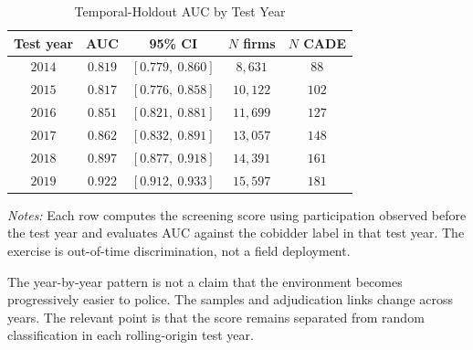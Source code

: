 \begin{table}[htbp]
\centering
\caption{Temporal-Holdout AUC by Test Year}
\label{tab:temporal_holdout_year_submission}
\footnotesize
\begin{threeparttable}
\begin{tabular}{ccccc}
\toprule
Test year & AUC & 95\% CI & $N$ firms & $N$ CADE \\
\midrule
$2014$ & $0.819$ & $[0.779,\ 0.860]$ & $8{,}631$ & $88$ \\
$2015$ & $0.817$ & $[0.776,\ 0.858]$ & $10{,}122$ & $102$ \\
$2016$ & $0.851$ & $[0.821,\ 0.881]$ & $11{,}699$ & $127$ \\
$2017$ & $0.862$ & $[0.832,\ 0.891]$ & $13{,}057$ & $148$ \\
$2018$ & $0.897$ & $[0.877,\ 0.918]$ & $14{,}391$ & $161$ \\
$2019$ & $0.922$ & $[0.912,\ 0.933]$ & $15{,}597$ & $181$ \\
\bottomrule
\end{tabular}
\begin{tablenotes}
\footnotesize
\item \textit{Notes:} Each row computes the screening score using
participation observed before the test year and evaluates AUC
against the cobidder label in that test year. The exercise is
out-of-time discrimination, not a field deployment.
\end{tablenotes}
\end{threeparttable}
\end{table}

The year-by-year pattern is not a claim that the environment
becomes progressively easier to police. The samples and
adjudication links change across years. The relevant point is
that the score remains separated from random classification in
each rolling-origin test year.
